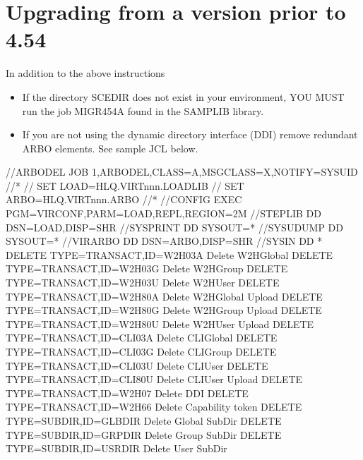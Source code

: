 \documentclass[letterpaper,10pt,english]{sphinxmanual}
\begin{document}
\ignorespaces 

\section{Upgrading from a version prior to 4.54}
\label{\detokenize{Migration_Guide:upgrading-from-a-version-prior-to-4-54}}\label{\detokenize{Migration_Guide:index-4}}
\sphinxAtStartPar
In addition to the above instructions
\begin{itemize}
\item {} 
\sphinxAtStartPar
If the directory SCE\sphinxhyphen{}DIR does not exist in your environment, YOU MUST run the job MIGR454A found in the SAMPLIB library.

\item {} 
\sphinxAtStartPar
If you are not using the dynamic directory interface (DDI) remove redundant ARBO elements. See sample JCL below.

\end{itemize}

\begin{sphinxVerbatim}[commandchars=\\\{\}]
//\PYGZdl{}ARBODEL JOB 1,ARBODEL,CLASS=A,MSGCLASS=X,NOTIFY=\PYGZam{}SYSUID
//*
// SET LOAD=HLQ.VIRTnnn.LOADLIB
// SET ARBO=HLQ.VIRTnnn.ARBO
//*
//CONFIG  EXEC PGM=VIRCONF,PARM=\PYGZsq{}LOAD,REPL\PYGZsq{},REGION=2M
//STEPLIB  DD  DSN=\PYGZam{}LOAD,DISP=SHR
//SYSPRINT DD  SYSOUT=*
//SYSUDUMP DD  SYSOUT=*
//VIRARBO  DD  DSN=\PYGZam{}ARBO,DISP=SHR
//SYSIN      DD *
 DELETE TYPE=TRANSACT,ID=W2H\PYGZhy{}03A    Delete W2H\PYGZhy{}Global
 DELETE TYPE=TRANSACT,ID=W2H\PYGZhy{}03G    Delete W2H\PYGZhy{}Group
 DELETE TYPE=TRANSACT,ID=W2H\PYGZhy{}03U    Delete W2H\PYGZhy{}User
 DELETE TYPE=TRANSACT,ID=W2H\PYGZhy{}80A    Delete W2H\PYGZhy{}Global Upload
 DELETE TYPE=TRANSACT,ID=W2H\PYGZhy{}80G    Delete W2H\PYGZhy{}Group Upload
 DELETE TYPE=TRANSACT,ID=W2H\PYGZhy{}80U    Delete W2H\PYGZhy{}User Upload
 DELETE TYPE=TRANSACT,ID=CLI\PYGZhy{}03A    Delete CLI\PYGZhy{}Global
 DELETE TYPE=TRANSACT,ID=CLI\PYGZhy{}03G    Delete CLI\PYGZhy{}Group
 DELETE TYPE=TRANSACT,ID=CLI\PYGZhy{}03U    Delete CLI\PYGZhy{}User
 DELETE TYPE=TRANSACT,ID=CLI\PYGZhy{}80U    Delete CLI\PYGZhy{}User Upload
 DELETE TYPE=TRANSACT,ID=W2H\PYGZhy{}07     Delete DDI
 DELETE TYPE=TRANSACT,ID=W2H\PYGZhy{}66     Delete Capability token
 DELETE TYPE=SUBDIR,ID=GLB\PYGZhy{}DIR      Delete Global Sub\PYGZhy{}Dir
 DELETE TYPE=SUBDIR,ID=GRP\PYGZhy{}DIR      Delete Group Sub\PYGZhy{}Dir
 DELETE TYPE=SUBDIR,ID=USR\PYGZhy{}DIR      Delete User Sub\PYGZhy{}Dir
\end{sphinxVerbatim}
\end{document}
